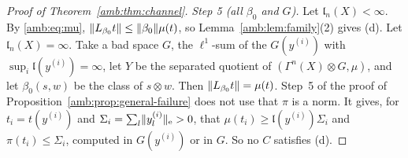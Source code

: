 \begin{proof}[Proof of Theorem~\ref{amb:thm:channel}]
\emph{Step 5 (all $\beta_0$ and $G$).} Let $\mathfrak l_n(X)<\infty$. By \eqref{amb:eq:mu}, $\lVert L_{\beta_0}t\rVert\le\lVert \beta_0\rVert\mu(t)$, so Lemma~\ref{amb:lem:family}(2) gives (d). Let $\mathfrak l_n(X)=\infty$. Take a bad space $G$, the $\ell^1$-sum of the $G(y^{(i)})$ with $\sup_i\mathfrak l(y^{(i)})=\infty$, let $Y$ be the separated quotient of $(\Gamma^n(X)\otimes G,\mu)$, and let $\beta_0(s,w)$ be the class of $s\otimes w$. Then $\lVert L_{\beta_0}t\rVert=\mu(t)$. Step~5 of the proof of Proposition~\ref{amb:prop:general-failure} does not use that $\pi$ is a norm. It gives, for $t_i=t(y^{(i)})$ and $\Sigma_i=\sum_l\lVert y^{(i)}_l\rVert_{\rm e}>0$, that $\mu(t_i)\ge\mathfrak l(y^{(i)})\Sigma_i$ and $\pi(t_i)\le\Sigma_i$, computed in $G(y^{(i)})$ or in $G$. So no $C$ satisfies (d).
\end{proof}

